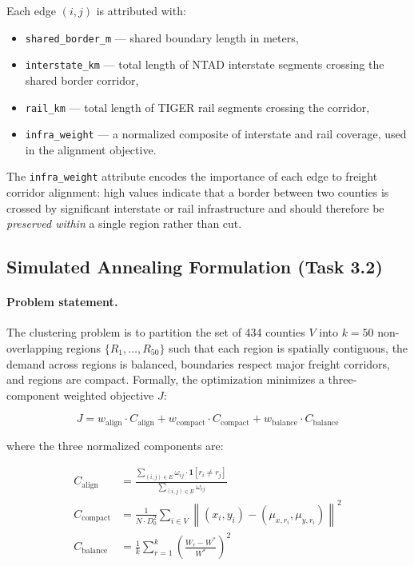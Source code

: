 Each edge $(i, j)$ is attributed with:
\begin{itemize}
  \item \texttt{shared\_border\_m} — shared boundary length in meters,
  \item \texttt{interstate\_km} — total length of NTAD interstate segments crossing the
        shared border corridor,
  \item \texttt{rail\_km} — total length of TIGER rail segments crossing the corridor,
  \item \texttt{infra\_weight} — a normalized composite of interstate and rail coverage,
        used in the alignment objective.
\end{itemize}

The \texttt{infra\_weight} attribute encodes the importance of each edge to freight
corridor alignment: high values indicate that a border between two counties is crossed
by significant interstate or rail infrastructure and should therefore be \emph{preserved
within} a single region rather than cut.

\subsection{Simulated Annealing Formulation (Task 3.2)}

\paragraph{Problem statement.}
The clustering problem is to partition the set of 434 counties $V$ into $k = 50$
non-overlapping regions $\{R_1, \ldots, R_{50}\}$ such that each region is spatially
contiguous, the demand across regions is balanced, boundaries respect major freight
corridors, and regions are compact. Formally, the optimization minimizes a
three-component weighted objective $J$:

\begin{equation}
J = w_{\text{align}} \cdot C_{\text{align}} + w_{\text{compact}} \cdot C_{\text{compact}}
    + w_{\text{balance}} \cdot C_{\text{balance}}
\label{eq:task3-obj}
\end{equation}

where the three normalized components are:

\begin{align}
C_{\text{align}}   &= \frac{\displaystyle\sum_{(i,j)\in E} \omega_{ij} \cdot
    \mathbf{1}[r_i \neq r_j]}{\displaystyle\sum_{(i,j)\in E} \omega_{ij}}
    \label{eq:task3-align} \\[6pt]
C_{\text{compact}} &= \frac{1}{N \cdot D_0^2}
    \sum_{i \in V} \left\| (x_i, y_i) - (\mu_{x,r_i}, \mu_{y,r_i}) \right\|^2
    \label{eq:task3-compact} \\[6pt]
C_{\text{balance}} &= \frac{1}{k} \sum_{r=1}^{k}
    \left(\frac{W_r - W^*}{W^*}\right)^2
    \label{eq:task3-balance}
\end{align}


